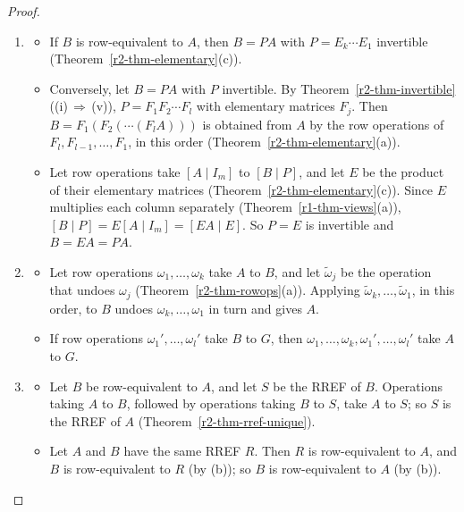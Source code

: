 \documentclass[12pt]{article}
\theoremstyle{definition}
\begin{document}
\begin{proof}
\begin{enumerate}
\item
\begin{itemize}
\item If \(B\) is row-equivalent to \(A\), then \(B=PA\) with \(P=E_k\cdots E_1\) invertible
(Theorem~\ref{r2-thm-elementary}(c)).
\item Conversely, let \(B=PA\) with \(P\) invertible. By Theorem~\ref{r2-thm-invertible}
((i)\,\(\Rightarrow\)\,(v)), \(P=F_1F_2\cdots F_l\) with elementary matrices \(F_j\). Then
\(B=F_1(F_2(\cdots(F_lA)))\) is obtained from \(A\) by the row operations of \(F_l,F_{l-1},\dots,F_1\), in this
order (Theorem~\ref{r2-thm-elementary}(a)).
\item Let row operations take \([A\mid I_m]\) to \([B\mid P]\), and let \(E\) be the product of their elementary
matrices (Theorem~\ref{r2-thm-elementary}(c)). Since \(E\) multiplies each column separately
(Theorem~\ref{r1-thm-views}(a)), \([B\mid P]=E[A\mid I_m]=[EA\mid E]\). So \(P=E\) is invertible and
\(B=EA=PA\).
\end{itemize}
\item
\begin{itemize}
\item Let row operations \(\omega_1,\dots,\omega_k\) take \(A\) to \(B\), and let \(\tilde\omega_j\) be the
operation that undoes \(\omega_j\) (Theorem~\ref{r2-thm-rowops}(a)). Applying
\(\tilde\omega_k,\dots,\tilde\omega_1\), in this order, to \(B\) undoes \(\omega_k,\dots,\omega_1\) in turn and
gives \(A\).
\item If row operations \(\omega_1',\dots,\omega_l'\) take \(B\) to \(G\), then
\(\omega_1,\dots,\omega_k,\omega_1',\dots,\omega_l'\) take \(A\) to \(G\).
\end{itemize}
\item
\begin{itemize}
\item Let \(B\) be row-equivalent to \(A\), and let \(S\) be the RREF of \(B\). Operations taking \(A\) to \(B\),
followed by operations taking \(B\) to \(S\), take \(A\) to \(S\); so \(S\) is the RREF of \(A\)
(Theorem~\ref{r2-thm-rref-unique}).
\item Let \(A\) and \(B\) have the same RREF \(R\). Then \(R\) is row-equivalent to \(A\), and \(B\) is
row-equivalent to \(R\) (by (b)); so \(B\) is row-equivalent to \(A\) (by (b)).\qedhere
\end{itemize}
\end{enumerate}
\end{proof}
\end{document}
